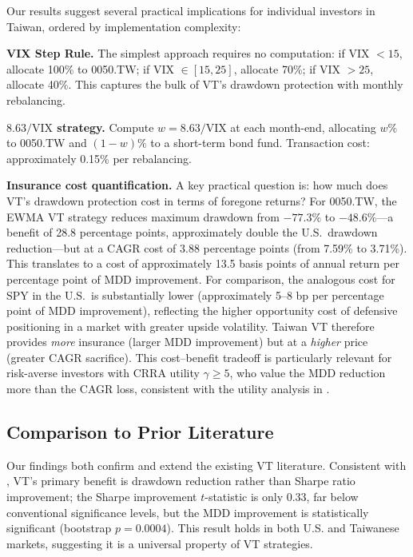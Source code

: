 Our results suggest several practical implications for individual investors in Taiwan, ordered by implementation complexity:

\textbf{VIX Step Rule.} The simplest approach requires no computation: if VIX $< 15$, allocate 100\% to 0050.TW; if VIX $\in [15, 25]$, allocate 70\%; if VIX $> 25$, allocate 40\%. This captures the bulk of VT's drawdown protection with monthly rebalancing.

\textbf{$8.63/\text{VIX}$ strategy.} Compute $w = 8.63 / \text{VIX}$ at each month-end, allocating $w\%$ to 0050.TW and $(1-w)\%$ to a short-term bond fund. Transaction cost: approximately 0.15\% per rebalancing.

\textbf{Insurance cost quantification.} A key practical question is: how much does VT's drawdown protection cost in terms of foregone returns? For 0050.TW, the EWMA VT strategy reduces maximum drawdown from $-77.3\%$ to $-48.6\%$---a benefit of 28.8 percentage points, approximately double the U.S.\ drawdown reduction---but at a CAGR cost of 3.88 percentage points (from 7.59\% to 3.71\%). This translates to a cost of approximately 13.5 basis points of annual return per percentage point of MDD improvement. For comparison, the analogous cost for SPY in the U.S.\ is substantially lower (approximately 5--8 bp per percentage point of MDD improvement), reflecting the higher opportunity cost of defensive positioning in a market with greater upside volatility. Taiwan VT therefore provides \textit{more} insurance (larger MDD improvement) but at a \textit{higher} price (greater CAGR sacrifice). This cost--benefit tradeoff is particularly relevant for risk-averse investors with CRRA utility $\gamma \geq 5$, who value the MDD reduction more than the CAGR loss, consistent with the utility analysis in \citet{moreira2017}.

\subsection{Comparison to Prior Literature}

Our findings both confirm and extend the existing VT literature. Consistent with \citet{moreira2017}, VT's primary benefit is drawdown reduction rather than Sharpe ratio improvement; the Sharpe improvement $t$-statistic is only 0.33, far below conventional significance levels, but the MDD improvement is statistically significant (bootstrap $p = 0.0004$). This result holds in both U.S. and Taiwanese markets, suggesting it is a universal property of VT strategies.

